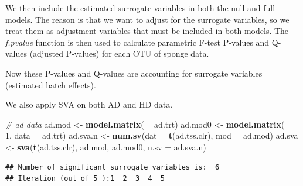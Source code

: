 \documentclass[]{book}
\newenvironment{Shaded}{\begin{snugshade}}{\end{snugshade}}
\newcommand{\KeywordTok}[1]{\textcolor[rgb]{0.13,0.29,0.53}{\textbf{#1}}}
\newcommand{\DataTypeTok}[1]{\textcolor[rgb]{0.13,0.29,0.53}{#1}}
\newcommand{\DecValTok}[1]{\textcolor[rgb]{0.00,0.00,0.81}{#1}}
\newcommand{\StringTok}[1]{\textcolor[rgb]{0.31,0.60,0.02}{#1}}
\newcommand{\CommentTok}[1]{\textcolor[rgb]{0.56,0.35,0.01}{\textit{#1}}}
\newcommand{\OperatorTok}[1]{\textcolor[rgb]{0.81,0.36,0.00}{\textbf{#1}}}
\newcommand{\NormalTok}[1]{#1}
\begin{document}
We then include the estimated surrogate variables in both the null and
full models. The reason is that we want to adjust for the surrogate
variables, so we treat them as adjustment variables that must be
included in both models. The \emph{f.pvalue} function is then used to
calculate parametric F-test P-values and Q-values (adjusted P-values)
for each OTU of sponge data.

\begin{Shaded}
\end{Shaded}

Now these P-values and Q-values are accounting for surrogate variables
(estimated batch effects).

We also apply SVA on both AD and HD data.

\begin{Shaded}
\begin{Highlighting}[]
\CommentTok{# ad data}
\NormalTok{ad.mod <-}\StringTok{ }\KeywordTok{model.matrix}\NormalTok{( }\OperatorTok{~}\StringTok{ }\NormalTok{ad.trt)}
\NormalTok{ad.mod0 <-}\StringTok{ }\KeywordTok{model.matrix}\NormalTok{( }\OperatorTok{~}\StringTok{ }\DecValTok{1}\NormalTok{, }\DataTypeTok{data =}\NormalTok{ ad.trt)}
\NormalTok{ad.sva.n <-}\StringTok{ }\KeywordTok{num.sv}\NormalTok{(}\DataTypeTok{dat =} \KeywordTok{t}\NormalTok{(ad.tss.clr), }\DataTypeTok{mod =}\NormalTok{ ad.mod)}
\NormalTok{ad.sva <-}\StringTok{ }\KeywordTok{sva}\NormalTok{(}\KeywordTok{t}\NormalTok{(ad.tss.clr), ad.mod, ad.mod0, }\DataTypeTok{n.sv =}\NormalTok{ ad.sva.n)}
\end{Highlighting}
\end{Shaded}

\begin{verbatim}
## Number of significant surrogate variables is:  6 
## Iteration (out of 5 ):1  2  3  4  5
\end{verbatim}
\end{document}
